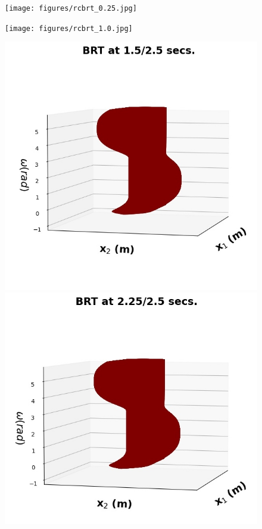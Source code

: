 \begin{figure}[tb!]
	\centering
	\begin{minipage}[b]{.45\textwidth}
		\texttt{[image: figures/rcbrt\_0.25.jpg]}
	\end{minipage}
	\begin{minipage}[b]{.45\textwidth}
		\texttt{[image: figures/rcbrt\_1.0.jpg]}
	\end{minipage}
	\begin{minipage}[b]{.45\textwidth}
		\includegraphics[width=\textwidth]{figures/rcbrt_1.75.jpg}
	\end{minipage}
	\begin{minipage}[b]{.45\textwidth}
		\includegraphics[width=\textwidth]{figures/rcbrt_2.5.jpg}

\end{minipage}
\end{figure}
